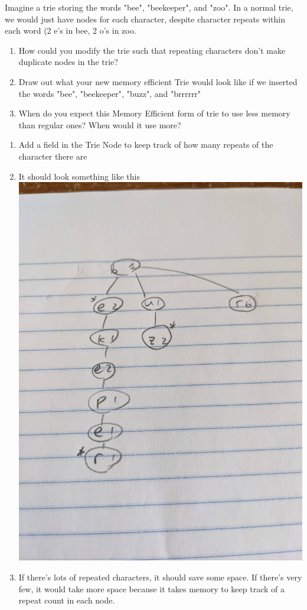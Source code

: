 \begin{blocksection}
\question Imagine a trie storing the words "bee", "beekeeper", and "zoo". In a normal trie, we would just have nodes for each character, despite character repeats within each word (2 e's in bee, 2 o's in zoo.
\begin{enumerate}
    \item How could you modify the trie such that repeating characters don't make duplicate nodes in the trie?
    \item Draw out what your new memory efficient Trie would look like if we inserted the words "bee", "beekeeper", "buzz", and "brrrrrr"
    \item When do you expect this Memory Efficient form of trie to use less memory than regular ones? When would it use more?
\end{enumerate}

\begin{solution}[1in]
\begin{enumerate}
    \item Add a field in the Trie Node to keep track of how many repeats of the character there are
    \item It should look something like this 
        \newline 
        \includegraphics[scale=0.1]{topics/trees/tries/medium/trie.jpg}
    \item If there's lots of repeated characters, it should save some space. If there's very few, it would take more space because it takes memory to keep track of a repeat count in each node.
\end{enumerate}
\end{solution}

\end{blocksection}